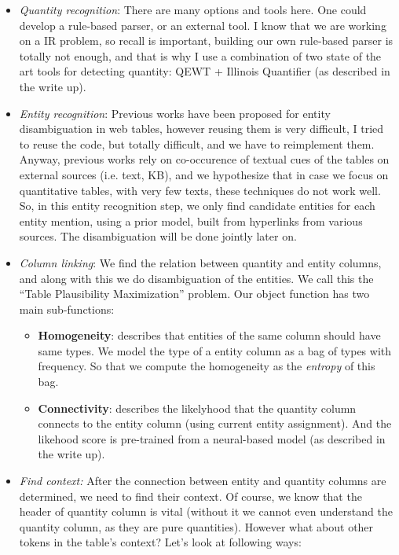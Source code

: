 \documentclass{article}
\begin{document}
\begin{itemize}
\item \textit{Quantity recognition}: There are many options and tools here. One could develop a rule-based parser, or an external tool. I know that we are working on a IR problem, so recall is important, building our own rule-based parser is totally not enough, and that is why I use a combination of two state of the art tools for detecting quantity: QEWT + Illinois Quantifier (as described in the write up).

\item \textit{Entity recognition}: Previous works have been proposed for entity disambiguation in web tables, however reusing them is very difficult, I tried to reuse the code, but totally difficult, and we have to reimplement them. Anyway, previous works rely on co-occurence of textual cues of the tables on external sources (i.e. text, KB), and we hypothesize that in case we focus on quantitative tables, with very few texts, these techniques do not work well. So, in this entity recognition step, we only find candidate entities for each entity mention, using a prior model, built from hyperlinks from various sources. The disambiguation will be done jointly later on.

\item \textit{Column linking}: We find the relation between quantity and entity columns, and along with this we do disambiguation of the entities. We call this the ``Table Plausibility Maximization'' problem. Our object function has two main sub-functions:
\begin{itemize}
\item \textbf{Homogeneity}: describes that entities of the same column should have same types. We model the type of a entity column as a bag of types with frequency. So that we compute the homogeneity as the \textit{entropy} of this bag.
\item \textbf{Connectivity}: describes the likelyhood that the quantity column connects to the entity column (using current entity assignment). And the likehood score is pre-trained from a neural-based model (as described in the write up).
\end{itemize}
\item \textit{Find context:} After the connection between entity and quantity columns are determined, we need to find their context. Of course, we know that the header of quantity column is vital (without it we cannot even understand the quantity column, as they are pure quantities). However what about other tokens in the table's context? Let's look at following ways:


\end{itemize}
\end{document}

